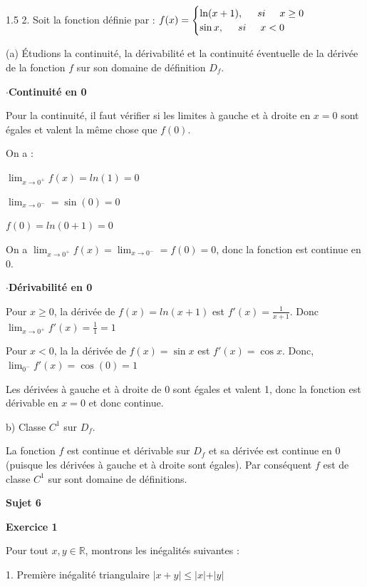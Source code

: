 \documentclass[12pt]{article}
\begin{document}
\begin{spacing}{1.5}
2. Soit la fonction définie par : $f(x)=\begin{cases}
\ln (x+1), \hspace{0,5 cm} si \hspace{0,5 cm} x\geq 0\\
\sin x, \hspace{0,5 cm} si \hspace{0,5 cm} x<0
\end{cases}$

 (a) Étudions la continuité, la dérivabilité et la continuité éventuelle de la dérivée de la fonction $f$ sur son domaine de définition $D_f$.
 
 $\cdot$\textbf{Continuité en 0}
 
 Pour la continuité, il faut vérifier si les limites à gauche et à droite en $x=0$ sont égales et valent la même chose que $f(0)$.
 
 On a :
 
 $\lim_{x \to 0^+}f(x)=ln(1)=0$
 
 $\lim_{x\to 0^-}=\sin(0)=0$
 
 $f(0)=ln(0+1)=0$
 
 On a $\lim_{x \to 0^+}f(x)=\lim_{x\to 0^-}=f(0)=0$, donc la fonction est continue en 0.
 
 $\cdot$\textbf{Dérivabilité en 0}
 
 Pour $x\geq 0$, la dérivée de $f(x)=ln(x+1)$ est $f'(x)=\frac{1}{x+1}$. Donc $\lim_{x\to 0^+}f'(x)=\frac{1}{1}=1$
 
 Pour $x<0$, la la dérivée de $f(x)=\sin x$ est $f'(x)=\cos x$. Donc, $\lim_{0^-}f'(x)=\cos(0)=1$
 
 \medskip Les dérivées à gauche et à droite de 0 sont égales et valent 1, donc la fonction est dérivable en $x=0$ et donc continue.
 
 b) Classe $C^1$ sur $D_f$.
 
 La fonction $f$ est continue et dérivable sur $D_f$ et sa dérivée est continue en 0 (puisque les dérivées à gauche et à droite sont égales). Par conséquent $f$ est de classe $C^1$ sur sont domaine de définitions.
 
 




\medskip\textbf{Sujet 6}

\medskip\textbf{Exercice 1}

Pour tout $x,y \in \mathbb{R}$, montrons les inégalités suivantes :
 
 1. Première inégalité triangulaire $\vert x+y\vert \leq \vert x\vert + \vert y\vert$
 

\end{spacing}
\end{document}
